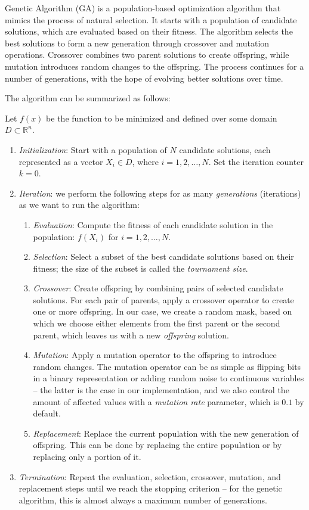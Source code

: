 \documentclass{article}
\begin{document}
Genetic Algorithm (GA) is a population-based optimization algorithm
that mimics the process of natural selection. It starts with a
population of candidate solutions, which are evaluated based on their
fitness. The algorithm selects the best solutions to form a new
generation through crossover and mutation operations. Crossover combines
two parent solutions to create offspring, while mutation introduces
random changes to the offspring. The process continues for a number of
generations, with the hope of evolving better solutions over time.

The algorithm can be summarized as follows:

Let $f(x)$ be the function to be minimized and defined over some domain
$D \subset \mathbb{R}^n$.

\begin{enumerate}
  \item \textit{Initialization}: Start with a population of $N$
    candidate solutions, each represented as a vector $X_i \in D$,
    where $i = 1, 2, \ldots, N$. Set the iteration counter $k = 0$.
  \item \textit{Iteration}: we perform the following steps for as many
    \textit{generations} (iterations) as we want to run the algorithm:
    \begin{enumerate}
      \item \textit{Evaluation}: Compute the fitness of each candidate
        solution in the population: $f(X_i)$ for $i = 1, 2, \ldots, N$.
      \item \textit{Selection}: Select a subset of the best candidate
        solutions based on their fitness; the size of the subset is
        called the \textit{tournament size}.
      \item \textit{Crossover}: Create offspring by combining pairs of
        selected candidate solutions. For each pair of parents, apply
        a crossover operator to create one or more offspring. In our
        case, we create a random mask, based on which we choose
        either elements from the first parent or the second parent,
        which leaves us with a new \textit{offspring} solution.
      \item \textit{Mutation}: Apply a mutation operator to the offspring
        to introduce random changes. The mutation operator can be as simple
        as flipping bits in a binary representation or adding random noise
        to continuous variables -- the latter is the case in our
        implementation, and we also control the amount of affected
        values with a \textit{mutation rate} parameter, which is
        $0.1$ by default.
      \item \textit{Replacement}: Replace the current population with the
        new generation of offspring. This can be done by replacing the
        entire population or by replacing only a portion of it.
    \end{enumerate}
  \item \textit{Termination}: Repeat the evaluation, selection,
    crossover, mutation, and replacement steps until we reach the
    stopping criterion -- for the genetic algorithm, this is almost
    always a maximum number of generations.
\end{enumerate}
\end{document}
